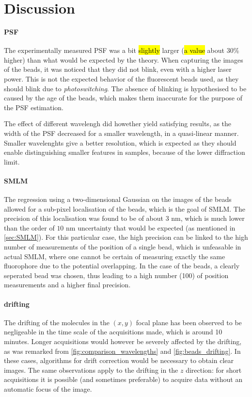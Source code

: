 \section{Discussion}
\paragraph{PSF}
The experimentally measured PSF was a bit \hl{slightly} larger (\hl{a value} about $30$\% higher) than what would be expected by the theory. When capturing the images of the beads, it was noticed that they did not blink, even with a higher laser power. This is not the expected behavior of the fluorescent beads used, as they should blink due to \emph{photoswitching}. The absence of blinking is hypothesised to be caused by the age of the beads, which makes them inaccurate for the purpose of the PSF estimation.

The effect of different wavelengh did howether yield satisfying results, as the width of the PSF decreased for a smaller wavelength, in a quasi-linear manner. Smaller wavelenghts give a better resolution, which is expected as they should enable distinguishing smaller features in samples, because of the lower diffraction limit.

\paragraph{SMLM}
The regression using a two-dimensional Gaussian on the images of the beads allowed for a sub-pixel localisation of the beads, which is the goal of SMLM. The precision of this localisation was found to be of about $3$ nm, which is much lower than the order of $10$ nm uncertainty that would be expected (as mentioned in \autoref{sec:SMLM}). For this particular case, the high precision can be linked to the high number of measurements of the position of a single bead, which is unfeasable in actual SMLM, where one cannot be certain of measuring exactly the same fluorophore due to the potential overlapping. In the case of the beads, a clearly seperated bead was chosen, thus leading to a high number (100) of position measurements and a higher final precision.

\paragraph{drifting}
The drifting of the molecules in the $(x,y)$ focal plane has been observed to be negligeable in the time scale of the acquisitions made, which is around 10 minutes.
Longer acquisitions would however be severely affected by the drifting, as was remarked from \autoref{fig:comparison_wavelengths} and \autoref{fig:beads_drifting}.
In these cases, algorithms for drift correction would be necessary to obtain clear images.
The same observations apply to the drifting in the $z$ direction: for short acquisitions it is possible (and sometimes preferable) to acquire data without an automatic focus of the image.


